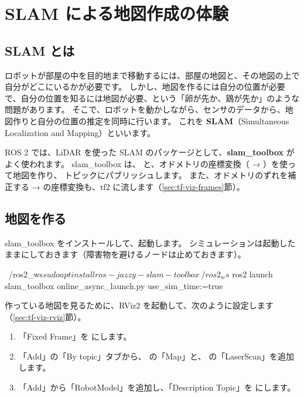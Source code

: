 \section{SLAM による地図作成の体験}
\label{sec:practice-slam}

\subsection{SLAM とは}

ロボットが部屋の中を目的地まで移動するには、部屋の地図と、その地図の上で自分がどこにいるかが必要です。
しかし、地図を作るには自分の位置が必要で、自分の位置を知るには地図が必要、という「卵が先か、鶏が先か」のような問題があります。
そこで、ロボットを動かしながら、センサのデータから、地図作りと自分の位置の推定を同時に行います。
これを \textbf{SLAM}（Simultaneous Localization and Mapping）といいます。

ROS 2 では、LiDAR を使った SLAM のパッケージとして、\textbf{slam\_toolbox} がよく使われます。
slam\_toolbox は、 と、オドメトリの座標変換（ → ）を使って地図を作り、 トピックにパブリッシュします。
また、オドメトリのずれを補正する  →  の座標変換も、tf2 に流します（\ref{sec:tf-viz-frames}節）。

\subsection{地図を作る}

slam\_toolbox をインストールして、起動します。
シミュレーションは起動したままにしておきます（障害物を避けるノードは止めておきます）。

\begin{terminal}
~/ros2_ws$ sudo apt install ros-jazzy-slam-toolbox
~/ros2_ws$ ros2 launch slam_toolbox online_async_launch.py use_sim_time:=true
\end{terminal}

作っている地図を見るために、RViz2 を起動して、次のように設定します（\ref{sec:tf-viz-rviz}節）。


\begin{enumerate}
  \item 「Fixed Frame」を  にします。
  \item 「Add」の「By topic」タブから、 の「Map」と、 の「LaserScan」を追加します。
  \item 「Add」から「RobotModel」を追加し、「Description Topic」を  にします。
\end{enumerate}

